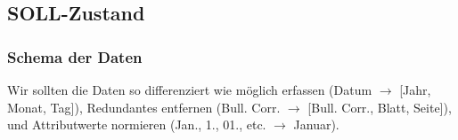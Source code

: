 %
%
%
%
%
%
%
%
%
%
%







\subsection{SOLL-Zustand}

\subsubsection{Schema der Daten}

Wir sollten die Daten so differenziert wie möglich erfassen (Datum $\rightarrow$ [Jahr, Monat, Tag]), Redundantes entfernen (Bull. Corr. $\rightarrow$ [Bull. Corr., Blatt, Seite]), und Attributwerte normieren (Jan., 1., 01., etc. $\rightarrow$ Januar).

{\small }





